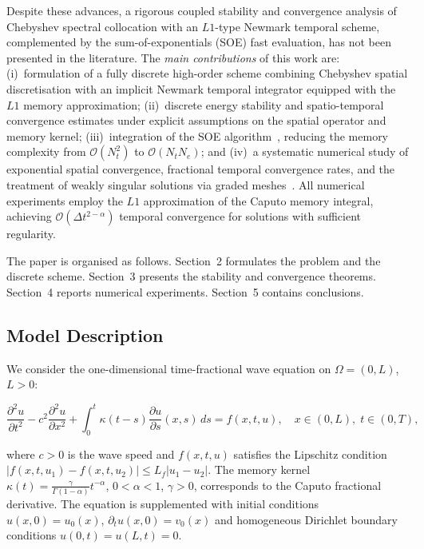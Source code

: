 \documentclass[a4paper,fleqn]{cas-sc}
\begin{document}
Despite these advances, a rigorous coupled stability and convergence analysis of Chebyshev spectral collocation with an $L1$-type Newmark temporal scheme, complemented by the sum-of-exponentials (SOE) fast evaluation, has not been presented in the literature. The \emph{main contributions} of this work are: (i)~formulation of a fully discrete high-order scheme combining Chebyshev spatial discretisation with an implicit Newmark temporal integrator equipped with the $L1$ memory approximation; (ii)~discrete energy stability and spatio-temporal convergence estimates under explicit assumptions on the spatial operator and memory kernel; (iii)~integration of the SOE algorithm~\cite{ref6}, reducing the memory complexity from $\mathcal{O}(N_t^2)$ to $\mathcal{O}(N_t N_e)$; and (iv)~a systematic numerical study of exponential spatial convergence, fractional temporal convergence rates, and the treatment of weakly singular solutions via graded meshes~\cite{stynes2017,liao2018sharp}. All numerical experiments employ the $L1$ approximation of the Caputo memory integral, achieving $\mathcal{O}(\Delta t^{2-\alpha})$ temporal convergence for solutions with sufficient regularity.

The paper is organised as follows. Section~2 formulates the problem and the discrete scheme. Section~3 presents the stability and convergence theorems. Section~4 reports numerical experiments. Section~5 contains conclusions.

\subsection{Model Description}\label{sec:model}

We consider the one-dimensional time-fractional wave equation on $\Omega = (0, L)$, $L > 0$:
\begin{linenomath}
\begin{equation}\label{eq:wave}
\frac{\partial^2 u}{\partial t^2} - c^2 \frac{\partial^2 u}{\partial x^2} + \int_0^t \kappa(t-s) \frac{\partial u}{\partial s}(x, s) \, ds = f(x, t, u), \quad x \in (0,L),\; t \in (0, T),
\end{equation}
\end{linenomath}
where $c > 0$ is the wave speed and $f(x, t, u)$ satisfies the Lipschitz condition $|f(x,t,u_1) - f(x,t,u_2)| \le L_f |u_1 - u_2|$. The memory kernel $\kappa(t) = \frac{\gamma}{\Gamma(1-\alpha)} t^{-\alpha}$, $0 < \alpha < 1$, $\gamma > 0$, corresponds to the Caputo fractional derivative. The equation is supplemented with initial conditions $u(x, 0) = u_0(x)$, $\partial_t u(x, 0) = v_0(x)$ and homogeneous Dirichlet boundary conditions $u(0, t) = u(L, t) = 0$.
\end{document}
